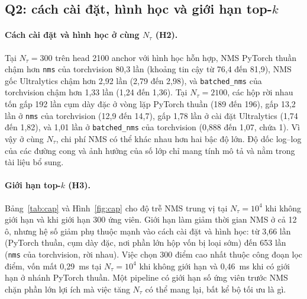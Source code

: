 \documentclass[a4paper,fleqn]{cas-dc}
\newcommand{\Ntau}{N_{\tau}}
\begin{document}
\subsection{Q2: cách cài đặt, hình học và giới hạn top-$k$}
\label{sec:q2}
\paragraph{Cách cài đặt và hình học ở cùng $\Ntau$ (H2).}
Tại $\Ntau=300$ trên head 2100 anchor với hình học hỗn hợp, NMS PyTorch thuần chậm hơn \texttt{nms} của torchvision 80,3 lần (khoảng tin cậy từ 76,4 đến 81,9), NMS gốc Ultralytics chậm hơn 2,92 lần (2,79 đến 2,98), và \texttt{batched\_nms} của torchvision chậm hơn 1,33 lần (1,24 đến 1,36). Tại $\Ntau=2100$, các hộp rời nhau tốn gấp 192 lần cụm dày đặc ở vòng lặp PyTorch thuần (189 đến 196), gấp 13,2 lần ở \texttt{nms} của torchvision (12,9 đến 14,7), gấp 1,78 lần ở cài đặt Ultralytics (1,74 đến 1,82), và 1,01 lần ở \texttt{batched\_nms} của torchvision (0,888 đến 1,07, chứa 1). Vì vậy ở cùng $\Ntau$, chi phí NMS có thể khác nhau hơn hai bậc độ lớn. Độ dốc log--log của các đường cong và ảnh hưởng của số lớp chỉ mang tính mô tả và nằm trong tài liệu bổ sung.

\paragraph{Giới hạn top-$k$ (H3).}
Bảng~\ref{tab:cap} và Hình~\ref{fig:cap} cho độ trễ NMS trung vị tại $\Ntau=10^4$ khi không giới hạn và khi giới hạn 300 ứng viên. Giới hạn làm giảm thời gian NMS ở cả 12 ô, nhưng hệ số giảm phụ thuộc mạnh vào cách cài đặt và hình học: từ 3,66 lần (PyTorch thuần, cụm dày đặc, nơi phần lớn hộp vốn bị loại sớm) đến 653 lần (\texttt{nms} của torchvision, rời nhau). Việc chọn 300 điểm cao nhất thuộc công đoạn lọc điểm, vốn mất 0,29~ms tại $\Ntau=10^4$ khi không giới hạn và 0,46~ms khi có giới hạn ở nhánh PyTorch thuần. Một pipeline có giới hạn số ứng viên trước NMS chặn phần lớn lợi ích mà việc tăng $\Ntau$ có thể mang lại, bất kể bộ tối ưu là gì.
\end{document}
